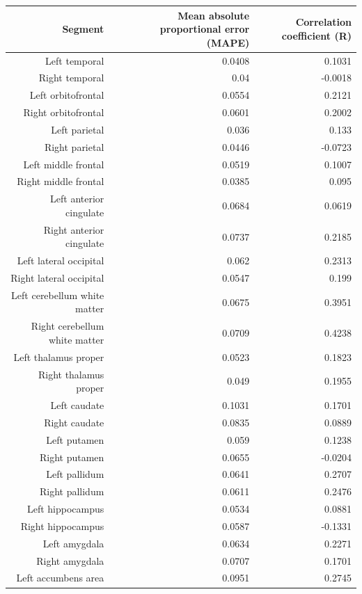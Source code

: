 \documentclass{article}
\begin{document}
  \begin{table}[h]
  
  \begin{centering}
    \tiny
    \begin{tabular}{|r|r|r|}
		  \hline
		  \textbf{Segment} & \textbf{Mean absolute proportional error (MAPE)} & \textbf{Correlation coefficient (R)} \\\hline
		  Left temporal & 0.0408 & 0.1031 \\
		  Right temporal & 0.04 & -0.0018 \\
		  Left orbitofrontal & 0.0554 & 0.2121 \\
		  Right orbitofrontal & 0.0601 & 0.2002 \\
		  Left parietal & 0.036 & 0.133 \\
		  Right parietal & 0.0446 & -0.0723 \\
		  Left middle frontal & 0.0519 & 0.1007 \\
		  Right middle frontal & 0.0385 & 0.095 \\
		  Left anterior cingulate & 0.0684 & 0.0619 \\
		  Right anterior cingulate & 0.0737 & 0.2185 \\
		  Left lateral occipital & 0.062 & 0.2313 \\
		  Right lateral occipital & 0.0547 & 0.199 \\
		  Left cerebellum white matter & 0.0675 & 0.3951 \\
		  Right cerebellum white matter & 0.0709 & 0.4238 \\
		  Left thalamus proper & 0.0523 & 0.1823 \\
		  Right thalamus proper & 0.049 & 0.1955 \\
		  Left caudate & 0.1031 & 0.1701 \\
		  Right caudate & 0.0835 & 0.0889 \\
		  Left putamen & 0.059 & 0.1238 \\
		  Right putamen & 0.0655 & -0.0204 \\
		  Left pallidum & 0.0641 & 0.2707 \\
		  Right pallidum & 0.0611 & 0.2476 \\
		  Left hippocampus & 0.0534 & 0.0881 \\
		  Right hippocampus & 0.0587 & -0.1331 \\
		  Left amygdala & 0.0634 & 0.2271 \\
		  Right amygdala & 0.0707 & 0.1701 \\
		  Left accumbens area & 0.0951 & 0.2745 \\

\end{tabular}
\end{centering}
\end{table}
\end{document}
